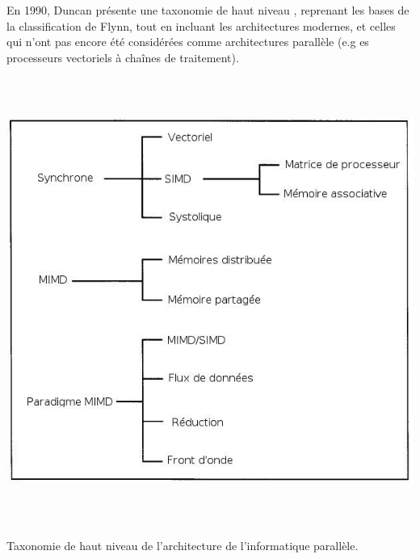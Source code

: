\documentclass[a4paper,12pt]{report}
\theoremstyle{plain}				%
\theoremstyle{definition}				%
\begin{document}
En 1990, Duncan présente une taxonomie de haut niveau \cite{44900}, reprenant les bases de la classification de Flynn, tout en incluant les architectures modernes, et celles qui n'ont pas encore été considérées comme architectures parallèle (e.g es processeurs vectoriels à chaînes de traitement).

{\centering
\includegraphics[width=16.272cm,height=14.605cm]{Biblio_PCmax_Rendu_Taxonomie_Duncan.jpg}
\par}
{\centering
Taxonomie de haut niveau de l'architecture de l'informatique parallèle.
\par}
 
\bigskip
\end{document}
